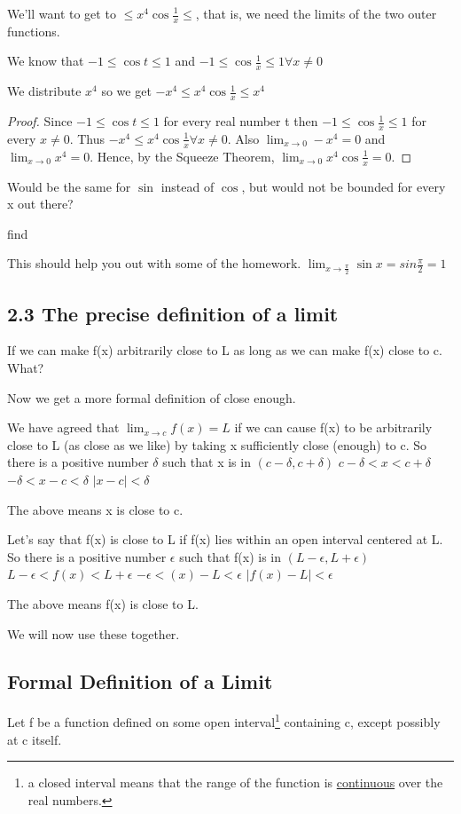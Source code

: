 \documentclass[12pt]{article}
\begin{document}
We'll want to get to $\leq x^4\cos \frac{1}{x} \leq$, that is, we need the limits of the two outer functions.

We know that $-1 \leq \cos t \leq 1$ and $-1 \leq \cos \frac{1}{x} \leq 1 \forall x \neq 0$

We distribute $x^4$ so we get $-x^4 \leq x^4 \cos \frac{1}{x} \leq x^4$

\begin{proof}
Since $-1 \leq \cos t \leq 1$ for every real number t then $-1 \leq \cos \frac{1}{x} \leq 1$ for every $x \neq
0$. Thus $-x^4 \leq x^4 \cos \frac{1}{x} \forall x \neq 0$. Also $\lim_{x \to 0} -x^4 = 0$ and $\lim_{x \to 0}
x^4 = 0$. Hence, by the Squeeze Theorem, $\lim_{x \to 0} x^4 \cos \frac{1}{x} = 0.$
\end{proof}
Would be the same for $\sin$ instead of $\cos$, but would not be bounded for every x out there?

find

This should help you out with some of the homework.
$\lim_{x \to \frac{\pi}{2}} \sin x = sin \frac{\pi}{2} = 1$

\subsection{2.3 The precise definition of a limit}
If we can make f(x) arbitrarily close to L as long as we can make f(x) close to c. What?

Now we get a more formal definition of close enough.

We have agreed that $\lim_{x \to c}f(x) = L$ if we can cause f(x) to be arbitrarily close to L (as close as we
like) by taking x sufficiently close (enough) to c.
So there is a positive number $\delta$ such that x is in $(c-\delta, c+\delta)$
$c- \delta < x < c + \delta$
$-\delta < x -c < \delta$
$|x - c| < \delta$

The above means x is close to c.


Let's say that f(x) is close to L if f(x) lies within an open interval centered at L. So there is a positive
number $\epsilon$ such that f(x) is in $(L-\epsilon{},L+\epsilon{})$
$
L-\epsilon < f(x) < L + \epsilon
$
$-\epsilon < (x) -L < \epsilon$
$|f(x)-L| < \epsilon$

The above means f(x) is close to L.

We will now use these together.

\subsection{Formal Definition of a Limit}
Let f be a function defined on some open interval\footnote{a closed interval means that the range of the
  function is \underline{continuous} over the real numbers.} containing c, except possibly at c itself.
\end{document}
